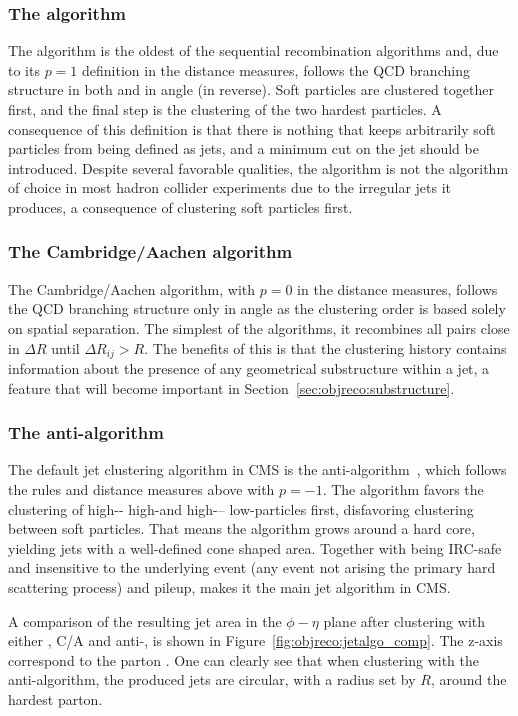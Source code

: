 \subsubsection{The \kt algorithm}
The \kt algorithm is the oldest of the sequential recombination algorithms and, due to its $p=1$ definition in the distance measures, follows the QCD branching structure in both \PT and in angle (in reverse). Soft particles are clustered together first, and the final step is the clustering of the two hardest particles. A consequence of this definition is that there is nothing that keeps arbitrarily soft particles from being defined as jets, and a minimum cut on the jet \PT should be introduced.
Despite several favorable qualities, the \kt algorithm is not the algorithm of choice in most hadron collider experiments due to the irregular jets it produces, a consequence of clustering soft particles first.

\subsubsection{The Cambridge/Aachen algorithm}
The Cambridge/Aachen algorithm, with $p=0$ in the distance measures, follows the QCD branching structure only in angle as the clustering order is based solely on spatial separation. The simplest of the algorithms, it recombines all pairs close in $\Delta R$ until $\Delta R_{ij} > R$.
The benefits of this is that the clustering history contains information about the presence of any geometrical substructure within a jet, a feature that will become important in Section~\ref{sec:objreco:substructure}.

\subsubsection{The anti-\kt algorithm}
The default jet clustering algorithm in CMS is the anti-\kt algorithm~\cite{Cacciari:2008gp}, which follows the rules and distance measures above with $p=-1$. The algorithm favors the clustering of high-\PT - high-\PT and high-\PT – low-\PT particles first, disfavoring clustering between soft particles. That means the algorithm grows around a hard core, yielding jets with a well-defined cone shaped area. Together with being IRC-safe and insensitive to the underlying event (any event not arising the primary hard scattering process) and pileup, makes it the main jet algorithm in CMS.



A comparison of the resulting jet area in the $\phi-\eta$ plane after clustering with either \kt, C/A and anti-\kt, is shown in Figure~\ref{fig:objreco:jetalgo_comp}. The z-axis correspond to the parton \PT. One can clearly see that when clustering with the anti-\kt algorithm, the produced jets are circular, with a radius set by $R$, around the hardest parton.

